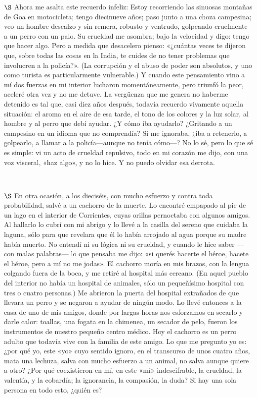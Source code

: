 \documentclass[a4paper, 12pt]{article}
\begin{document}
$\S$ Ahora me asalta este recuerdo infeliz: Estoy recorriendo las sinuosas
montañas de Goa en motocicleta; tengo diecinueve años; paso junto a una choza
campesina; veo un hombre descalzo y sin remera, robusto y ventrudo, golpeando
cruelmente a un perro con un palo. Su crueldad me asombra; bajo la velocidad y
digo: tengo que hacer algo. Pero a medida que desacelero pienso: «¿cuántas veces
te dijeron que, sobre todas las cosas en la India, te cuides de no tener
problemas que involucren a la policía?». (La corrupción y el abuso de poder son
absolutos, y uno como turista es particularmente vulnerable.) Y cuando este
pensamiento vino a mí dos fuerzas en mi interior lucharon momentáneamente, pero
triunfó la peor, aceleré otra vez y no me detuve. La vergüenza que me genera no
haberme detenido es tal que, casi diez años después, todavía recuerdo vivamente
aquella situación: el aroma en el aire de esa tarde, el tono de los colores y la
luz solar, al hombre y al perro que debí ayudar. ¿Y cómo iba ayudarlo? ¿Gritando
a un campesino en un idioma que no comprendía? Si me ignoraba, ¿iba a retenerlo,
a golpearlo, a llamar a la policía---aunque no tenía cómo---? No lo sé, pero lo
que sé es simple: vi un acto de crueldad repulsivo, todo en mi corazón me dijo,
con una voz visceral, «haz algo», y no lo hice. Y no puedo olvidar esa derrota.

~

$\S$ En otra ocasión, a los dieciséis, con mucho esfuerzo y contra toda
probabilidad, salvé a un cachorro de la muerte. Lo encontré empapado al pie de
un lago en el interior de Corrientes, cuyas orillas pernoctaba con algunos
amigos. Al hallarlo lo cubrí con mi abrigo y lo llevé a la casilla del sereno
que cuidaba la laguna, sólo para que revelara que él lo había arrojado al agua
porque su madre había muerto. No entendí ni su lógica ni su crueldad, y cuando
le hice saber ---con malas palabras--- lo que pensaba me dijo: «si querés
hacerte el héroe, hacete el héroe, pero a mí no me jodas». El cachorro moría en
mis brazos, con la lengua colgando fuera de la boca, y me retiré al hospital más
cercano. (En aquel pueblo del interior no había un hospital de animales, sólo un
pequeñísimo hospital con tres o cuatro personas.) Me abrieron la puerta del
hospital extrañados de que llevara un perro y se negaron a ayudar de ningún
modo. Lo llevé entonces a la casa de uno de mis amigos, donde por largas horas
nos esforzamos en secarlo y darle calor: toallas, una fogata en la chimenea, un
secador de pelo, fueron los instrumentos de nuestro pequeño centro médico. Hoy
el cachorro es un perro adulto que todavía vive con la familia de este amigo. Lo
que me pregunto yo es: ¿por qué yo, este «yo» cuyo sentido ignoro, en el
transcurso de unos cuatro años, mata una lechuza, salva con mucho esfuerzo a un
animal, no salva aunque quiere a otro? ¿Por qué coexistieron en mí, en este «mí»
indescifrable, la crueldad, la valentía, y la cobardía; la ignorancia, la
compasión, la duda? Si hay una sola persona en todo esto, ¿quién es?
\end{document}
